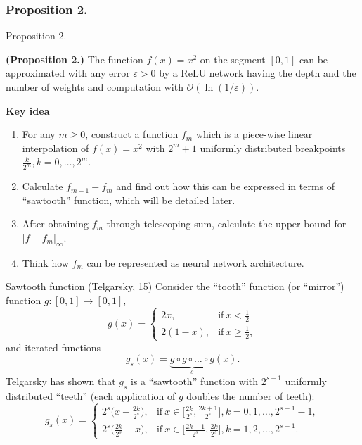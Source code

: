 \documentclass{if-beamer}
\begin{document}
\subsubsection{Proposition 2.}
\begin{frame}{Proposition 2.}
    \begin{tcolorbox}
    \textbf{(Proposition 2.)}
        The function $f(x)=x^{2}$ on the segment $[0,1]$ can be approximated with any error $\varepsilon>0$ by a ReLU network having the depth and the number of weights and computation with $\mathcal{O}(\ln(1/\varepsilon))$.
    \end{tcolorbox}
    \textbf{Key idea}
    \begin{enumerate}
        \item For any $m\geq0$, construct a function $f_m$ which is a piece-wise linear interpolation of $f(x)=x^{2}$ with $2^{m}+1$ uniformly distributed breakpoints $\frac{k}{2^{m}},k=0,\dots,2^{m}$. 
        \item Calculate $f_{m-1}-f_{m}$ and find out how this can be expressed in terms of ``sawtooth'' function, which will be detailed later.
        \item After obtaining $f_m$ through telescoping sum, calculate the upper-bound for $\left| f - f_{m} \right|_{\infty}$.
        \item Think how $f_m$ can be represented as neural network architecture.
    \end{enumerate}
\end{frame}

\begin{frame}{Sawtooth function (Telgarsky, 15)}
    Consider the ``tooth'' function (or ``mirror'') function $g:[0,1]\rightarrow{[0,1]}$,
    \begin{equation*}
        g(x) = 
        \begin{cases}
            2x, & \text{if}\ x<\frac{1}{2} \\
            2(1-x), & \text{if}\ x\geq\frac{1}{2},
        \end{cases}
    \end{equation*}
    and iterated functions 
    \begin{equation*}
        g_{s}(x)=\underbrace{g \circ g \circ \dots \circ g}_{s}(x).
    \end{equation*}
    Telgarsky has shown that $g_{s}$ is a ``sawtooth'' function with $2^{s-1}$ uniformly distributed ``teeth'' (each application of $g$ doubles the number of teeth):
    \begin{equation*}
        g_{s}(x)=
        \begin{cases}
            2^{s}\big(x-\frac{2k}{2^{s}}\big), & \text{if}\ x \in \big[ \frac{2k}{2^{s}}, \frac{2k+1}{2^{s}} \big], k = 0,1,\dots,2^{s-1}-1,\\
            2^{s}\big(\frac{2k}{2^{s}}-x\big), & \text{if}\ x \in \big[ \frac{2k-1}{2^{s}}, \frac{2k}{2^{s}} \big], k = 1,2,\dots,2^{s-1}.
        \end{cases}
    \end{equation*}
\end{frame}
\end{document}
